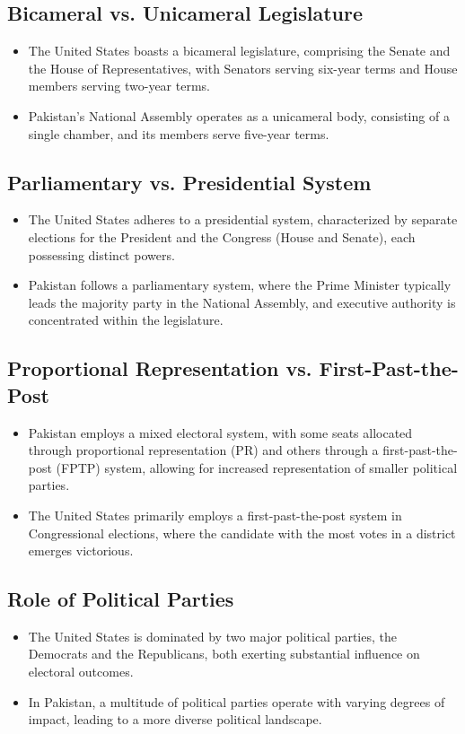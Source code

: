 \documentclass{article}
\begin{document}
\subsection{Bicameral vs. Unicameral Legislature}
\begin{itemize}
    \item The United States boasts a bicameral legislature, comprising the Senate and the House of Representatives, with Senators serving six-year terms and House members serving two-year terms.
    \item Pakistan's National Assembly operates as a unicameral body, consisting of a single chamber, and its members serve five-year terms.
\end{itemize}

\subsection{Parliamentary vs. Presidential System}
\begin{itemize}
    \item The United States adheres to a presidential system, characterized by separate elections for the President and the Congress (House and Senate), each possessing distinct powers.
    \item Pakistan follows a parliamentary system, where the Prime Minister typically leads the majority party in the National Assembly, and executive authority is concentrated within the legislature.
\end{itemize}

\subsection{Proportional Representation vs. First-Past-the-Post}
\begin{itemize}
    \item Pakistan employs a mixed electoral system, with some seats allocated through proportional representation (PR) and others through a first-past-the-post (FPTP) system, allowing for increased representation of smaller political parties.
    \item The United States primarily employs a first-past-the-post system in Congressional elections, where the candidate with the most votes in a district emerges victorious.
\end{itemize}

\subsection{Role of Political Parties}
\begin{itemize}
    \item The United States is dominated by two major political parties, the Democrats and the Republicans, both exerting substantial influence on electoral outcomes.
    \item In Pakistan, a multitude of political parties operate with varying degrees of impact, leading to a more diverse political landscape.
\end{itemize}
\end{document}

